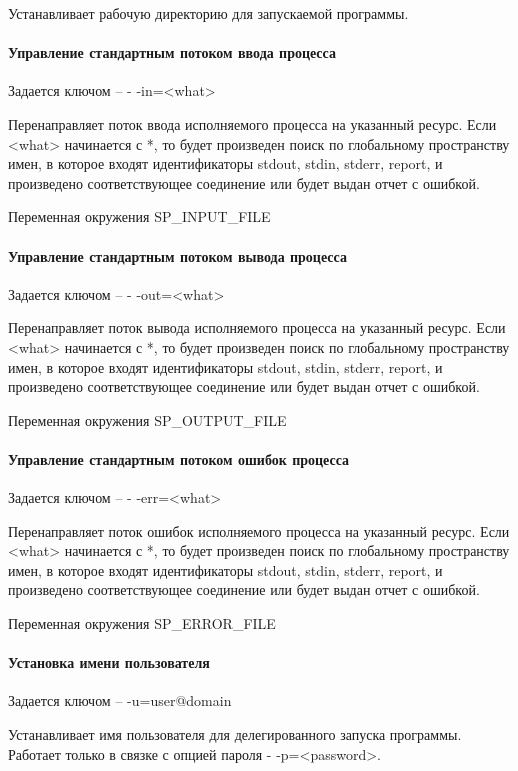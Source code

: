 \documentclass{imcs}
\begin{document}
Устанавливает рабочую директорию для запускаемой программы.

\paragraph{Управление стандартным потоком ввода процесса}
Задается ключом -- - -in=<what>

Перенаправляет поток ввода исполняемого процесса на указанный ресурс. Если <what> начинается с *, то будет произведен поиск по глобальному пространству имен, в которое входят идентификаторы stdout, stdin, stderr, report, и произведено соответствующее соединение или будет выдан отчет с ошибкой.

Переменная окружения   SP\_INPUT\_FILE

\paragraph{Управление стандартным потоком вывода процесса}
Задается ключом -- - -out=<what>

Перенаправляет поток вывода исполняемого процесса на указанный ресурс. Если <what> начинается с *, то будет произведен поиск по глобальному пространству имен, в которое входят идентификаторы stdout, stdin, stderr, report, и произведено соответствующее соединение или будет выдан отчет с ошибкой.

Переменная окружения   SP\_OUTPUT\_FILE

\paragraph{Управление стандартным потоком ошибок процесса}
Задается ключом -- - -err=<what>

Перенаправляет поток ошибок исполняемого процесса на указанный ресурс. Если <what> начинается с *, то будет произведен поиск по глобальному пространству имен, в которое входят идентификаторы stdout, stdin, stderr, report, и произведено соответствующее соединение или будет выдан отчет с ошибкой.

Переменная окружения   SP\_ERROR\_FILE

\paragraph{Установка имени пользователя}
Задается ключом -- -u=user@domain

Устанавливает имя пользователя для делегированного запуска программы. Работает только в связке с опцией пароля - -p=<password>. 
\end{document}
